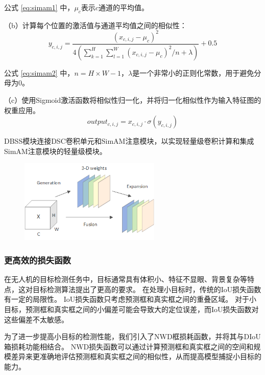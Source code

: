 公式 \ref{eq:simam1} 中，$\mu_c$表示$c$通道的平均值。

（b）计算每个位置的激活值与通道平均值之间的相似性：
\begin{equation}
    \label{eq:simam2}
    y_{c,i,j} = \frac{(x_{c,i,j}-\mu_c)^2}{4\left(\sum_{k=1}^{H}\sum_{l=1}^{W}(x_{c,i,j}-\mu_c)^2/n+\lambda \right)}+0.5
\end{equation}

公式 \ref{eq:simam2} 中，$n={H}\times{W}-1$，$\lambda$是一个非常小的正则化常数，用于避免分母为$0$。

（c）使用Sigmoid激活函数将相似性归一化，并将归一化相似性作为输入特征图的权重应用。
\begin{equation}
    \label{eq:simam3}
    output_{c,i,j} = x_{c,i,j} \cdot \sigma(y_{c,i,j})
\end{equation}

DBSS模块连接DSC卷积单元和SimAM注意模块，以实现轻量级卷积计算和集成SimAM注意模块的轻量级模块。

\begin{figure}[htbp]
    \centering
    \includegraphics[width=0.6\textwidth]{../figure/SimAM.png}
    \captionsetup{font=footnotesize}
    \label{fig:SimAM}
\end{figure}

\subsubsection{更高效的损失函数}

在无人机的目标检测任务中，目标通常具有体积小、特征不显眼、背景复杂等特点，这对目标检测算法提出了更高的要求。 在处理小目标时，传统的IoU损失函数有一定的局限性。
IoU损失函数只考虑预测框和真实框之间的重叠区域。 对于小目标，预测框和真实框之间的小偏差可能会导致大的定位误差，而IoU损失函数对这些偏差不太敏感。

为了进一步提高小目标的检测性能，我们引入了NWD框损耗函数，并将其与DIoU箱损耗功能相结合。
NWD损失函数可以通过计算预测框和真实框之间的空间和规模差异来更准确地评估预测框和真实框之间的相似性，从而提高模型捕捉小目标的能力。

